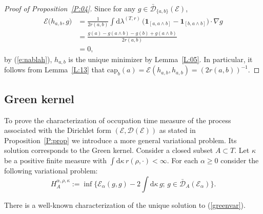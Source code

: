 \documentclass[11pt]{amsart}
\numberwithin{equation}{section}
\begin{document}
{\begin{proof}[Proof of Proposition~\ref{P:04}]
Since for any $g\in\bar{\mathcal D}_{\{{a},{b}\}}(\mathcal E)$,
\begin{equation}\label{e:dir.6}
\begin{aligned}
  \mathcal E\big(h_{{a},{b}},g\big)
 &=
  \frac{1}{2r({a},{b})}\int\mathrm{d}\lambda^{(T,r)}\,\big(\mathbf{1}_{[{a},{a}\wedge {b}]}-\mathbf{1}_{[{b},{a}\wedge {b}]}\big)\cdot \nabla g
  \\
 &=
  \frac{g({a})-g({a}\wedge {b})-g({b})+g({a}\wedge {b})}{2r({a},{b})}
  \\
 &=0,
\end{aligned}
\end{equation}
by (\ref{e:nablah}),
$h_{{a},{b}}$ is the unique minimizer by Lemma~\ref{L:05}. In particular,
it follows from Lemma~\ref{L:13} that
$\mathrm{cap}_{b}(a)={\mathcal E}(h_{a,b},h_{a,b})=(2r(a,b))^{-1}$.
\end{proof}{\smallskip}

\subsection{Green kernel}
\label{Sub:Green}
To prove  the characterization of occupation time measure of the process associated with the Dirichlet form $({\mathcal E},{\mathcal D}({\mathcal E}))$ as stated in Proposition~\ref{P:prop} we introduce a more general variational
problem. Its solution corresponds to the {{\it} Green kernel}. Consider a closed  subset  $A\subset T$.
Let $\kappa$ be a positive finite measure with $\int\mathrm{d}\kappa\,r({\rho},\boldsymbol{\cdot})<\infty$. For each $\alpha\ge 0$ consider the following
variational problem:
\begin{equation}\label{greenvar}
   H^{\alpha,{\rho},\kappa}_{A}
 :=
   \inf\big\{\mathcal E_\alpha(g,g)-{2}\int{\mathrm{d}\kappa\, g};\,g\in\bar{\mathcal D}_A(\mathcal E_\alpha)\big\}.
\end{equation}{\smallskip}

There is a well-known characterization of the unique solution to (\ref{greenvar}). {\smallskip}

}
\end{document}

